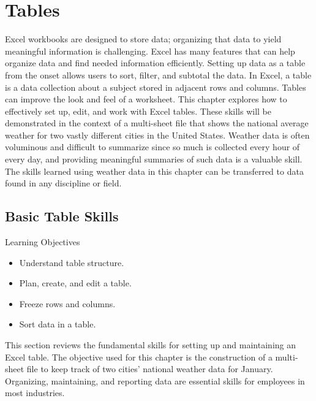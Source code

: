 \chapter{Tables}\label{ch05:tables}

Excel workbooks are designed to store data; organizing that data to yield meaningful information is challenging. Excel has many features that can help organize data and find needed information efficiently. Setting up data as a table from the onset allows users to sort, filter, and subtotal the data. In Excel, a table is a data collection about a subject stored in adjacent rows and columns. Tables can improve the look and feel of a worksheet. This chapter explores how to effectively set up, edit, and work with Excel tables. These skills will be demonstrated in the context of a multi-sheet file that shows the national average weather for two vastly different cities in the United States. Weather data is often voluminous and difficult to summarize since so much is collected every hour of every day, and providing meaningful summaries of such data is a valuable skill. The skills learned using weather data in this chapter can be transferred to data found in any discipline or field.

\section{Basic Table Skills}

\begin{center}
	\begin{objbox}{Learning Objectives}
		\begin{itemize}
			\setlength{\itemsep}{0pt}
			\setlength{\parskip}{0pt}
			\setlength{\parsep}{0pt}
			
			\item Understand table structure.
			\item Plan, create, and edit a table.
			\item Freeze rows and columns.
			\item Sort data in a table.
		\end{itemize}
	\end{objbox}
\end{center}

This section reviews the fundamental skills for setting up and maintaining an Excel table. The objective used for this chapter is the construction of a multi-sheet file to keep track of two cities' national weather data for January. Organizing, maintaining, and reporting data are essential skills for employees in most industries.

